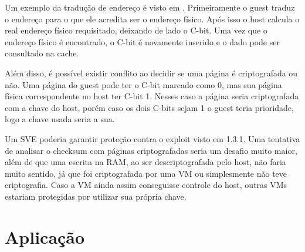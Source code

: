 \documentclass{report}
\begin{document}
Um exemplo da tradução de endereço é visto em \label{sev-address-translation}.
Primeiramente o guest traduz o endereço para o que ele acredita ser o endereço
físico. Após isso o host calcula o real endereço físico requisitado, deixando
de lado o C-bit. Uma vez que o endereço físico é encontrado, o C-bit é
novamente inserido e o dado pode ser consultado na cache.

Além disso, é possível existir conflito ao decidir se uma página é criptografada
ou não. Uma página do guest pode ter o C-bit marcado como 0, mas sua página
física correspondente no host ter C-bit 1. Nesses caso a página seria
criptografada com a chave do host, porém caso os dois C-bits sejam 1 o guest
teria prioridade, logo a chave usada seria a sua.

Um SVE poderia garantir proteção contra o exploit visto em 1.3.1. Uma
tentativa de analisar o checksum com páginas criptografadas seria um desafio
muito maior, além de que uma escrita na RAM, ao ser descriptografada pelo host,
não faria muito sentido, já que foi criptografada por uma VM ou simplesmente
não teve criptografia. Caso a VM ainda assim conseguisse controle do host,
outras VMs estariam protegidas por utilizar sua própria chave.

\section{Aplicação}


\nocite{*}

\end{document}
